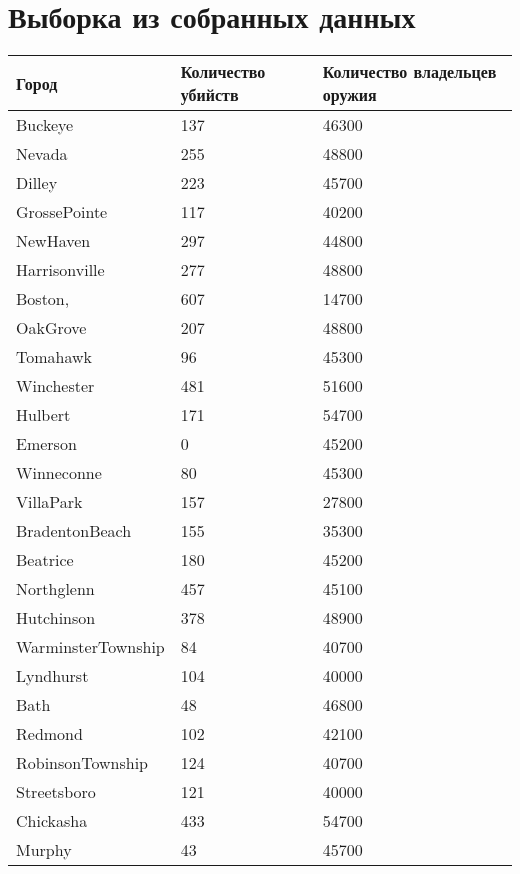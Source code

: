\documentclass[titlepage]{article}
\begin{document}
\clearpage
\appendix
\section{Выборка из собранных данных}
\label{sec:appendix}
\begin{table}[!ht]
    \centering
    \begin{tabular}{|l|l|l|}
    \hline
        Город & Количество убийств & Количество владельцев оружия \\ \hline
        Buckeye & 137 & 46300 \\ \hline
        Nevada & 255 & 48800 \\ \hline
        Dilley & 223 & 45700 \\ \hline
        GrossePointe & 117 & 40200 \\ \hline
        NewHaven & 297 & 44800 \\ \hline
        Harrisonville & 277 & 48800 \\ \hline
        Boston, & 607 & 14700 \\ \hline
        OakGrove & 207 & 48800 \\ \hline
        Tomahawk & 96 & 45300 \\ \hline
        Winchester & 481 & 51600 \\ \hline
        Hulbert & 171 & 54700 \\ \hline
        Emerson & 0 & 45200 \\ \hline
        Winneconne & 80 & 45300 \\ \hline
        VillaPark & 157 & 27800 \\ \hline
        BradentonBeach & 155 & 35300 \\ \hline
        Beatrice & 180 & 45200 \\ \hline
        Northglenn & 457 & 45100 \\ \hline
        Hutchinson & 378 & 48900 \\ \hline
        WarminsterTownship & 84 & 40700 \\ \hline
        Lyndhurst & 104 & 40000 \\ \hline
        Bath & 48 & 46800 \\ \hline
        Redmond & 102 & 42100 \\ \hline
        RobinsonTownship & 124 & 40700 \\ \hline
        Streetsboro & 121 & 40000 \\ \hline
        Chickasha & 433 & 54700 \\ \hline
        Murphy & 43 & 45700 \\ \hline

\end{tabular}
\end{table}
\end{document}
